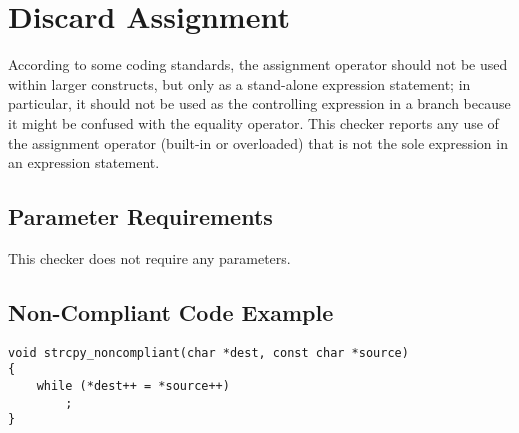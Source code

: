 %
%

\section{Discard Assignment}
\label{DiscardAssignment::overview}

According to some coding standards, the assignment operator should not be used
within larger constructs, but only as a stand-alone expression statement; in
particular, it should not be used as the controlling expression in a branch
because it might be confused with the equality operator. This checker reports
any use of the assignment operator (built-in or overloaded) that is not the
sole expression in an expression statement.

\subsection{Parameter Requirements}

This checker does not require any parameters.

\subsection{Non-Compliant Code Example}

\begin{verbatim}
void strcpy_noncompliant(char *dest, const char *source)
{
    while (*dest++ = *source++)
        ;
}
\end{verbatim}

